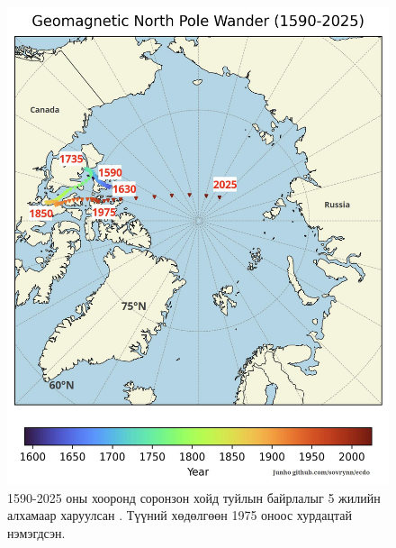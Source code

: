 \documentclass[10pt,twocolumn,letterpaper]{article}
\begin{document}
\begin{figure}[t]
\begin{center}
   \includegraphics[width=1\linewidth]{npw.jpg}
\end{center}
   \caption{1590-2025 оны хооронд соронзон хойд туйлын байрлалыг 5 жилийн алхамаар харуулсан \cite{41}. Түүний хөдөлгөөн 1975 оноос хурдацтай нэмэгдсэн.}
\label{fig:13}
\label{fig:onecol}
\end{figure}
\end{document}

